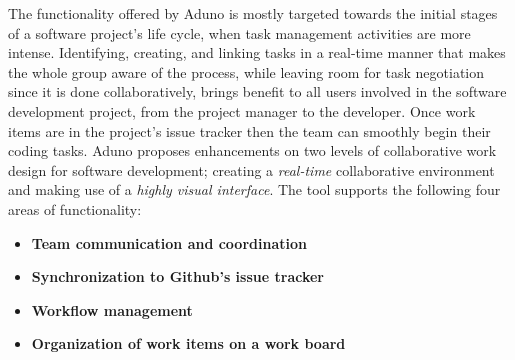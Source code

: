 \documentclass[conference]{IEEEtran}
\begin{document}
The functionality offered by Aduno is mostly targeted towards the initial stages of a software project's life cycle, when task management activities are more intense. Identifying, creating, and linking tasks in a real-time manner that makes the whole group aware of the process, while leaving room for task negotiation since it is done collaboratively, brings benefit to all users involved in the software development project, from the project manager to the developer. Once work items are in the project's issue tracker then the team can smoothly begin their coding tasks. Aduno proposes enhancements on two levels of collaborative work design for software development; creating a \textit{real-time} collaborative environment and making use of a \textit{highly visual interface}. The tool supports the following four areas of functionality:

\begin{itemize}
	\item \textbf{Team communication and coordination}
	\item \textbf{Synchronization to Github's issue tracker}
	\item \textbf{Workflow management}
	\item \textbf{Organization of work items on a work board}
\end{itemize}
\end{document}
